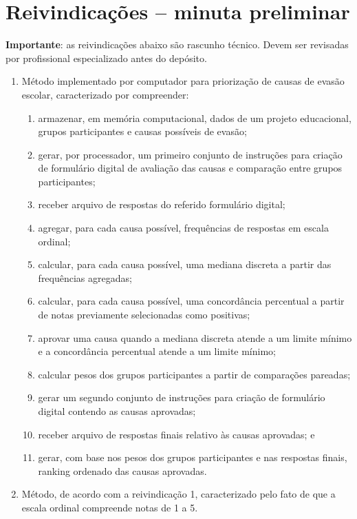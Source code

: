 \section{Reivindicações -- minuta preliminar}

\textbf{Importante}: as reivindicações abaixo são rascunho técnico. Devem ser revisadas por profissional especializado antes do depósito.

\begin{enumerate}
  \item Método implementado por computador para priorização de causas de evasão escolar, caracterizado por compreender:
  \begin{enumerate}[label=\alph*)]
    \item armazenar, em memória computacional, dados de um projeto educacional, grupos participantes e causas possíveis de evasão;
    \item gerar, por processador, um primeiro conjunto de instruções para criação de formulário digital de avaliação das causas e comparação entre grupos participantes;
    \item receber arquivo de respostas do referido formulário digital;
    \item agregar, para cada causa possível, frequências de respostas em escala ordinal;
    \item calcular, para cada causa possível, uma mediana discreta a partir das frequências agregadas;
    \item calcular, para cada causa possível, uma concordância percentual a partir de notas previamente selecionadas como positivas;
    \item aprovar uma causa quando a mediana discreta atende a um limite mínimo e a concordância percentual atende a um limite mínimo;
    \item calcular pesos dos grupos participantes a partir de comparações pareadas;
    \item gerar um segundo conjunto de instruções para criação de formulário digital contendo as causas aprovadas;
    \item receber arquivo de respostas finais relativo às causas aprovadas; e
    \item gerar, com base nos pesos dos grupos participantes e nas respostas finais, ranking ordenado das causas aprovadas.
  \end{enumerate}

  \item Método, de acordo com a reivindicação 1, caracterizado pelo fato de que a escala ordinal compreende notas de 1 a 5.


\end{enumerate}
